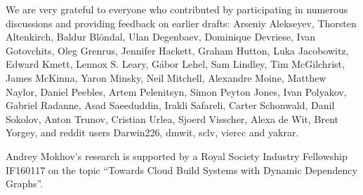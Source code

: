 \documentclass[acmsmall,screen]{acmart}
\newcommand{\cmd}[1]{\textsf{\color[rgb]{0,0,0.5} #1}}
\begin{document}

\maketitle










\begin{acks}
  \vspace{-0.5mm}
  We are very grateful to everyone who contributed by participating in numerous
  discussions and providing feedback on earlier drafts: Arseniy Alekseyev,
  Thorsten Altenkirch, Baldur Bl{\"o}ndal, Ulan Degenbaev, Dominique Devriese,
  Ivan Gotovchits, Oleg Grenrus, Jennifer Hackett, Graham Hutton,
  Luka Jacobowitz, Edward Kmett, Lennox S. Leary, G\'abor Lehel, Sam Lindley,
  Tim McGilchrist, James McKinna, Yaron Minsky, Neil Mitchell,
  Alexandre Moine, Matthew Naylor, Daniel Peebles, Artem Pelenitsyn,
  Simon Peyton Jones, Ivan Polyakov, Gabriel Radanne, Asad Saeeduddin,
  Irakli Safareli, Carter Schonwald, Danil Sokolov, Anton Trunov,
  Cristian Urlea, Sjoerd Visscher, Alexa de Wit, Brent Yorgey,
  and reddit users \cmd{Darwin226}, \cmd{dmwit}, \cmd{sclv}, \cmd{viercc} and
  \cmd{yakrar}.

  Andrey Mokhov's research is supported by a Royal Society Industry Fellowship
  \cmd{IF160117} on the topic ``Towards Cloud Build Systems with Dynamic
  Dependency Graphs''.
  \vspace{-1.5mm}
\end{acks}


\end{document}

